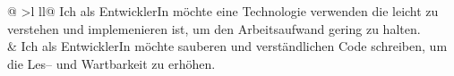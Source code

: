 \begin{longtable}[c]{@{}
>{}l ll@{}}
  {Ich als EntwicklerIn möchte eine Technologie verwenden die leicht zu verstehen und implemenieren ist, um den Arbeitsaufwand gering zu halten.}\\
  \midrule
   &
  {Ich als EntwicklerIn möchte sauberen und verständlichen Code schreiben, um die Les-- und Wartbarkeit zu erhöhen.}\\
  \bottomrule {}
  \vspace{0.1cm}\\
  \noalign{\hspace{0.0525\textwidth}\grayRule}
  \caption{Anforderungen aus Entwicklungsperspektive}
  \label{tab:dev}\\
\end{longtable}
%
